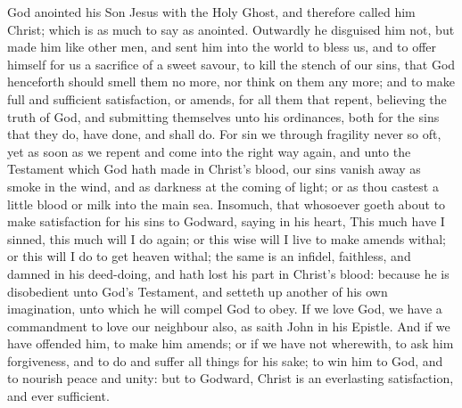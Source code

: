 God anointed his Son Jesus with the Holy Ghost, and 
therefore called him Christ; which is as much to say as 
anointed. Outwardly he disguised him not, but made 
him like other men, and sent him into the world to bless 
us, and to offer himself for us a sacrifice of a sweet savour, 
to kill the stench of our sins, that God henceforth should 
smell them no more, nor think on them any more; and to 
make full and sufficient satisfaction, or amends, for all 
them that repent, believing the truth of God, and submitting
themselves unto his ordinances, both for the sins 
that they do, have done, and shall do. For sin we through 
fragility never so oft, yet as soon as we repent and come 
into the right way again, and unto the Testament which 
God hath made in Christ's blood, our sins vanish away 
as smoke in the wind, and as darkness at the coming of 
light; or as thou castest a little blood or milk into the main 
sea. Insomuch, that whosoever goeth about to make 
satisfaction for his sins to Godward, saying in his heart, 
This much have I sinned, this much will I do again; or 
this wise will I live to make amends withal; or this will I 
do to get heaven withal; the same is an infidel, faithless, 
and damned in his deed-doing, and hath lost his part in 
Christ's blood: because he is disobedient unto God's 
Testament, and setteth up another of his own imagination,
unto which he will compel God to obey. If we 
love God, we have a commandment to love our neighbour 
also, as saith John in his Epistle. And if we have offended 
him, to make him amends; or if we have not wherewith, 
to ask him forgiveness, and to do and suffer all things for 
his sake; to win him to God, and to nourish peace and 
unity: but to Godward, Christ is an everlasting satisfaction,
and ever sufficient. 


